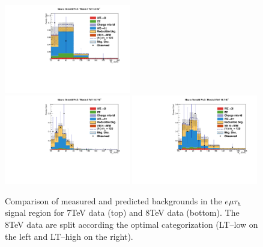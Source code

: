 \begin{figure}
\begin{center}
  \includegraphics[width=0.49\textwidth]{4_Analisys/pics/7TeV/plots/emt/LTCut/final-subMass-LTCut.pdf}\\
  \includegraphics[width=0.49\textwidth]{4_Analisys/pics/8TeV/plots/emt/LTLow/final-subMass-LTLow.pdf}
  \includegraphics[width=0.49\textwidth]{4_Analisys/pics/8TeV/plots/emt/LTHigh/final-subMass-LTHigh.pdf}\\
  \caption{Comparison of measured and predicted backgrounds in the $e\mu\tau_h$ signal region for 7TeV data (top) and 8TeV data (bottom). The 8TeV data are split according the optimal categorization (LT--low on the left and LT--high on the right).}
  \label{fig:LLT_emt_prefit}
\end{center}
\end{figure}

